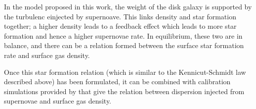 In the model proposed in this work, the weight of the disk galaxy is supported by the turbulenc einjected by supernoave.
This links density and star formation together; a higher density leads to a feedback effect which leads to more star formation and hence a higher supernovae rate.
In equilibrium, these two are in balance, and there can be a relation formed between the surface star formation rate and surface gas density.

Once this star formation relation (which is similar to the Kennicut-Schmidt law described above) has been formulated, it can be combined with calibration simulations provided by \citet{martizzi2015} that give the relation between dispersion injected from supernovae and surface gas density.
